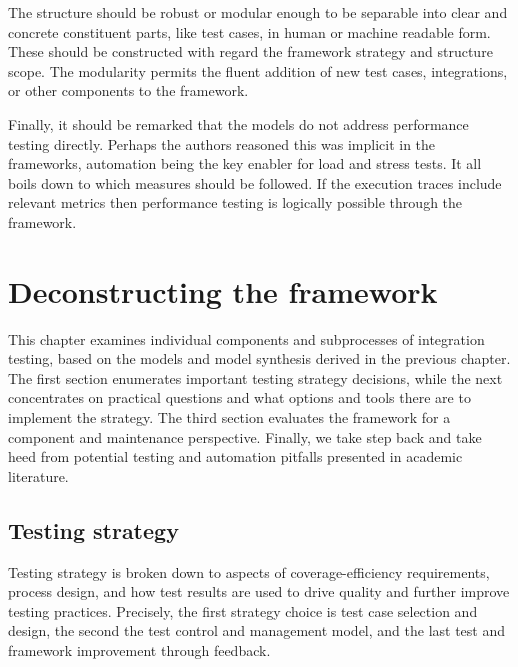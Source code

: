 \documentclass[12pt,a4paper,oneside,pdftex]{report}
\begin{document}
The structure should be robust or modular enough to be separable into clear and concrete constituent parts, like test cases, in human or machine readable form. These should be constructed with regard the framework strategy and structure scope. The modularity permits the fluent addition of new test cases, integrations, or other components to the framework.

Finally, it should be remarked that the models do not address performance testing directly. Perhaps the authors reasoned this was implicit in the frameworks, automation being the key enabler for load and stress tests. It all boils down to which measures should be followed. If the execution traces include relevant metrics then performance testing is logically possible through the framework.

\begin{comment}
The testing process can vary in its mode of execution or degree of automation. In what is perhaps the most extreme case, test case are run automatically every time a change is committed to system source code. This approach is called continuous integration (CI). 
\end{comment}


\chapter{Deconstructing the framework}
\label{chapter:frameworkanalysis}

This chapter examines individual components and subprocesses of integration testing, based on the models and model synthesis derived in the previous chapter. The first section enumerates important testing strategy decisions, while the next concentrates on practical questions and what options and tools there are to implement the strategy. The third section evaluates the framework for a component and maintenance perspective. Finally, we take step back and take heed from potential testing and automation pitfalls presented in academic literature. 

\section{Testing strategy}

Testing strategy is broken down to aspects of coverage-efficiency requirements, process design, and how test results are used to drive quality and further improve testing practices. Precisely, the first strategy choice is test case selection and design, the second the test control and management model, and the last test and framework improvement through feedback. %
\end{document}

